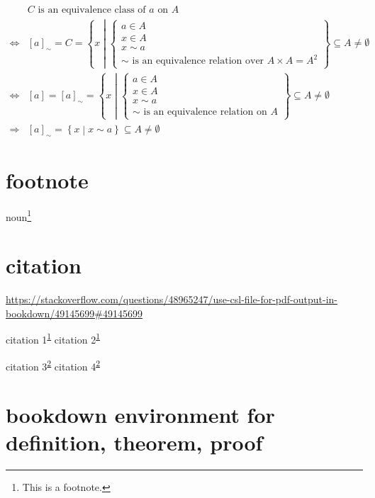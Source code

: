 \documentclass[
]{book}
\theoremstyle{definition}
\theoremstyle{definition}
\theoremstyle{definition}
\theoremstyle{definition}
\theoremstyle{remark}
\begin{document}
\begin{align}
 & C\text{ is an equivalence class of }a\text{ on }A\\
\Leftrightarrow & \left[a\right]_{\sim}=C=\left\{ x\middle|\begin{cases}
a\in A\\
x\in A\\
x\sim a\\
\sim\text{ is an equivalence relation over }A\times A=A^{2}
\end{cases}\right\} \subseteq A\ne\emptyset\\
\Leftrightarrow & \left[a\right]=\left[a\right]_{\sim}=\left\{ x\middle|\begin{cases}
a\in A\\
x\in A\\
x\sim a\\
\sim\text{ is an equivalence relation on }A
\end{cases}\right\} \subseteq A\ne\emptyset \label{eq:eqclass2}\\
\Rightarrow & \left[a\right]_{\sim}=\left\{ x\middle|x\sim a\right\} \subseteq A\ne\emptyset
\end{align}

\hypertarget{footnote}{%
\section{footnote}\label{footnote}}

noun\footnote{This is a footnote.}

\hypertarget{citation}{%
\section{citation}\label{citation}}

\url{https://stackoverflow.com/questions/48965247/use-csl-file-for-pdf-output-in-bookdown/49145699\#49145699}

citation 1\textsuperscript{\protect\hyperlink{ref-noauthor_bookdown_2019}{1}} citation 2\textsuperscript{\protect\hyperlink{ref-noauthor_bookdown_2019}{1}}

citation 3\textsuperscript{\protect\hyperlink{ref-ccjou2009}{2}} citation 4\textsuperscript{\protect\hyperlink{ref-ccjou2009}{2}}

\hypertarget{bookdown-environment-for-definition-theorem-proof}{%
\section{bookdown environment for definition, theorem, proof}\label{bookdown-environment-for-definition-theorem-proof}}
\end{document}
